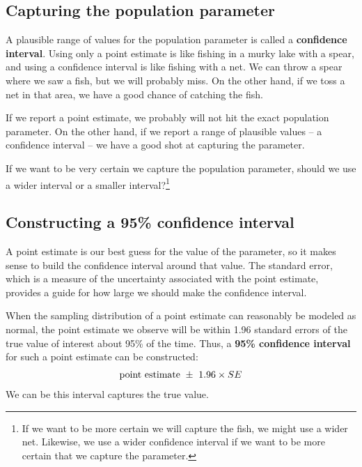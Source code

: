 \subsection{Capturing the population parameter}

A plausible range of values for the population parameter is called a \textbf{confidence interval}. Using only a point estimate is like fishing in a murky lake with a spear, and using a confidence interval is like fishing with a net. We can throw a spear where we saw a fish, but we will probably miss. On the other hand, if we toss a net in that area, we have a good chance of catching the fish.

If we report a point estimate, we probably will not hit the exact population parameter. On the other hand, if we report a range of plausible values -- a confidence interval -- we have a good shot at capturing the parameter.

\begin{exercise}
If we want to be very certain we capture the population parameter, should we use a wider interval or a smaller interval?\footnote{If we want to be more certain we will capture the fish, we might use a wider net. Likewise, we use a wider confidence interval if we want to be more certain that we capture the parameter.}
\end{exercise}


\subsection{Constructing a 95\% confidence interval}

A point estimate is our best guess for the value of the parameter, so it makes sense to build the confidence interval around that value. The standard error, which is a measure of the uncertainty associated with the point estimate, provides a guide for how large we should make the confidence interval.

\begin{termBox}{
When the sampling distribution of a point estimate can reasonably be modeled as normal, the point estimate we observe will be within 1.96 standard errors of the true value of interest about 95\% of the time. Thus, a \textbf{95\% confidence interval} for such a point estimate can be constructed:\vspace{-2mm}
\begin{align}
\text{point estimate}\ \pm\ 1.96 \times SE\vspace{-2mm}
\label{95PercentConfidenceIntervalFormula}
\end{align}
We can be  this interval captures the true value.}
\end{termBox}

